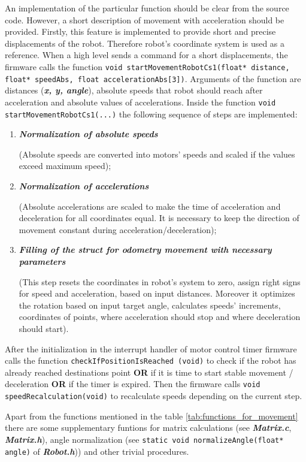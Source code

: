 \documentclass[a4paper,12pt]{article} %
\newcommand{\textitbf}[1]{\textbf{\textit{#1}}}
\newcommand{\inlinecode}[1]{\lstinline{#1}}
\begin{document}
An implementation of the particular function should be clear from the source code. However, a short description of movement with acceleration should be provided. Firstly, this feature is implemented to provide short and precise displacements of the robot. Therefore robot's coordinate system is used as a reference. When a high level sends a command for a short displacements, the firmware calls the function \inlinecode{void startMovementRobotCs1(float* distance, float* speedAbs, float accelerationAbs[3])}. Arguments of the function are distances (\textitbf{x, y, angle}), absolute speeds that robot should reach after acceleration and absolute values of accelerations. Inside the function \inlinecode{void startMovementRobotCs1(...)} the following sequence of steps are implemented:
\begin{enumerate}
\item \textitbf{Normalization of absolute speeds}

(Absolute speeds are converted into motors' speeds and scaled if the values exceed maximum speed);
\item \textitbf{Normalization of accelerations}

(Absolute accelerations are scaled to make the time of acceleration and deceleration for all coordinates equal. It is necessary to keep the direction of movement constant during acceleration/deceleration);
\item \textitbf{Filling of the struct for odometry movement with necessary parameters}

(This step resets the coordinates in robot's system to zero, assign right signs for speed and acceleration, based on input distances. Moreover it optimizes the rotation based on input target angle, calculates speeds' increments, coordinates of points, where acceleration should stop and where deceleration should start).
\end{enumerate}

After the initialization in the interrupt handler of motor control timer firmware calls the function \inlinecode{checkIfPositionIsReached (void)} to check if the robot has already reached destinations point \textbf{OR} if it is time to start stable movement / deceleration \textbf{OR} if the timer is expired. Then the firmware calls \inlinecode{void speedRecalculation(void)} to recalculate speeds depending on the current step.


Apart from the functions mentioned in the table \ref{tab:functions_for_movement} there are some supplementary funtions for matrix calculations (see \textitbf{Matrix.c}, \textitbf{Matrix.h}), angle normalization (see \inlinecode{static void normalizeAngle(float* angle)} of \textitbf{Robot.h})) and other trivial procedures.
\end{document}
